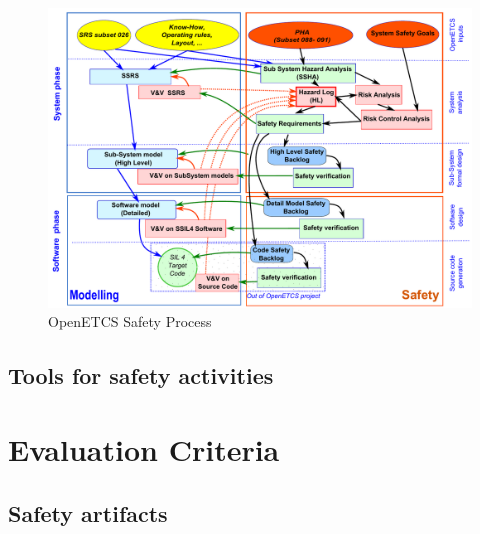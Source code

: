 \documentclass{template/openetcs_article}
\begin{document}
\begin{figure}[h]
\centering
\includegraphics[width=0.8\linewidth]{./images/WholeSafetyProcess}
\caption{OpenETCS Safety Process}
\label{fig:WholeSafetyProcess}
\end{figure}


\subsection{Tools for safety activities}

\section{Evaluation Criteria}

\subsection{Safety artifacts}
\end{document}
